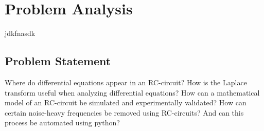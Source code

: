 \chapter{Problem Analysis}
jdkfnasdk

\section{Problem Statement}
Where do differential equations appear in an RC-circuit? How is the Laplace transform useful when analyzing differential equations? How can a mathematical model of an RC-circuit be simulated and experimentally validated? How can certain noise-heavy frequencies be removed using RC-circuits? And can this process be automated using python?